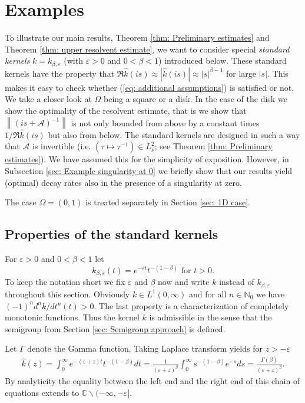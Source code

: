 \documentclass{amsart}
\newcommand{\abs}[1]{\left|#1\right|}
\newcommand{\norm}[1]{\left\| #1 \right\|}
\newcommand{\A}{\mathcal{A}}
\newcommand{\khat}{\hat{k}}
\newcommand{\C}{\mathbb{C}}
\newcommand{\N}{\mathbb{N}}
\begin{document}
\section{Examples}\label{sec: examples}
To illustrate our main results, Theorem \ref{thm: Preliminary estimates} and Theorem \ref{thm: upper resolvent estimate}, we want to consider special \emph{standard kernels} $k=k_{\beta,\varepsilon}$ (with $\varepsilon>0$ and $0<\beta<1$) introduced below. These standard kernels have the property that $\Re\khat(is)\approx |\khat(is)|\approx \abs{s}^{\beta-1}$ for large $\abs{s}$. This makes it easy to check whether (\ref{eq: additional assumptions}) is satisfied or not. We take a closer look at $\Omega$ being a square or a disk. In the case of the disk we show the optimality of the resolvent estimate, that is we show that $\norm{(is+\A)^{-1}}$ is not only bounded from above by a constant times $1/\Re\khat(is)$ but also from below. The standard kernels are designed in such a way that $\A$ is invertible (i.e. $(\tau\mapsto\tau^{-1})\in L^2_{\nu}$; see Theorem \ref{thm: Preliminary estimates}). We have assumed this for the simplicity of exposition. However, in Subsection \ref{sec: Example singularity at 0} we briefly show that our results yield (optimal) decay rates also in the presence of a singularity at zero.

The case $\Omega=(0,1)$ is treated separately in Section \ref{sec: 1D case}.

\subsection{Properties of the standard kernels}\label{sec: examples kernel}
For $\varepsilon>0$ and $0<\beta<1$ let
\begin{equation}\nonumber
 k_{\beta, \varepsilon}(t) = e^{-\varepsilon t}t^{-(1-\beta)} \text{ for } t>0 .
\end{equation}
To keep the notation short we fix $\varepsilon$ and $\beta$ now and write $k$ instead of $k_{\beta, \varepsilon}$ throughout this section. Obviously $k\in L^1(0,\infty)$ and for all $n\in\N_0$ we have $(-1)^n d^nk/dt^n(t) > 0$. The last property is a characterization of completely monotonic functions. Thus the kernel $k$ is admissible in the sense that the semigroup from Section \ref{sec: Semigroup approach} is defined. 

Let $\Gamma$ denote the Gamma function. Taking Laplace transform yields for $z>-\varepsilon$
\begin{align*}
 \khat(z) = \int_0^{\infty} e^{-(\varepsilon+z)t}t^{-(1-\beta)} dt 
 = \frac{1}{(\varepsilon+z)^{\beta}} \int_0^{\infty} s^{-(1-\beta)} e^{-s} ds 
 = \frac{\Gamma(\beta)}{(\varepsilon+z)^{\beta}} .
\end{align*}
By analyticity the equality between the left end and the right end of this chain of equations extends to $\C\backslash(-\infty,-\varepsilon]$. 
\end{document}
